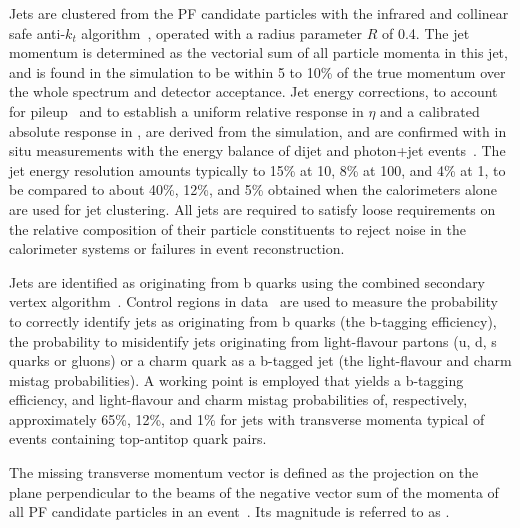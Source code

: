 Jets are clustered from the PF candidate particles with the infrared
and collinear safe anti-$k_t$ algorithm~\cite{antikt}, operated with a
radius parameter $R$ of 0.4. The jet momentum is determined as the
vectorial sum of all particle momenta in this jet, and is found in the
simulation to be within 5 to 10\% of the true momentum over the whole
\pt spectrum and detector acceptance. Jet energy corrections, to
account for pileup~\cite{pileup} and to establish a uniform relative
response in $\eta$ and a calibrated absolute response in \Pt, are
derived from the simulation, and are confirmed with in situ
measurements with the energy balance of dijet and photon+jet
events~\cite{Chatrchyan:2011ds}. The jet energy resolution amounts
typically to 15\% at 10\GeV, 8\% at 100\GeV, and 4\% at 1\TeV, to be
compared to about 40\%, 12\%, and 5\% obtained when the calorimeters
alone are used for jet clustering.
All jets are required to satisfy loose requirements on the relative
composition of their particle constituents to reject noise in the
calorimeter systems or failures in event reconstruction.

Jets are identified as originating from b quarks using the combined
secondary vertex algorithm~\cite{CMS-PAS-BTV-12-001}. Control regions
in data~\cite{bjets} are used to measure the probability to correctly
identify jets as originating from b quarks (the b-tagging efficiency),
the probability to misidentify jets originating from light-flavour
partons (u, d, s quarks or gluons) or a charm quark as a b-tagged jet
(the light-flavour and charm mistag probabilities). A working point is
employed that yields a b-tagging efficiency, and light-flavour and
charm mistag probabilities of, respectively, approximately 65\%, 12\%,
and 1\% for jets with transverse momenta typical of events containing
top-antitop quark pairs.

The missing transverse momentum vector \ptvecmiss is defined as the
projection on the plane perpendicular to the beams of the negative
vector sum of the momenta of all PF candidate particles in an
event~\cite{cms-met}. Its magnitude is referred to as \ETmiss.
